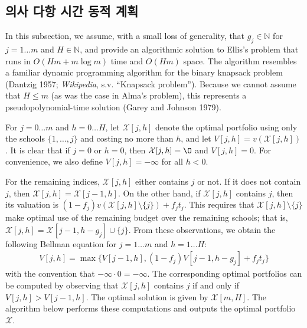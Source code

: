 \documentclass[12pt]{article} %
\newif\ifen
\theoremstyle{definition}
\theoremstyle{definition}
\begin{document}
\ifen \subsection{Pseudopolynomial-time dynamic program} \else\subsection{의사 다항 시간 동적 계획} \fi
In this subsection, we assume, with a small loss of generality, that $g_j \in \mathbb{N}$ for $j = 1\dots m$ and $H \in\mathbb{N}$, and provide an algorithmic solution to Ellis's problem that runs in $O(Hm + m\log m)$ time and $O(Hm)$ space. The algorithm resembles a familiar dynamic programming algorithm for the binary knapsack problem (Dantzig 1957; \emph{Wikipedia}, s.v. ``Knapsack problem''). Because we cannot assume that $H \leq m$ (as was the case in Alma's problem), this represents a pseudopolynomial-time solution (Garey and Johnson 1979).

For $j = 0 \dots m$ and $h = 0 \dots H$, let $\mathcal{X}[j, h]$ denote the optimal portfolio using only the schools $\{ 1, \dots, j\}$ and costing no more than $h$, and let $V[j,h] = v(\mathcal{X}[j, h])$.  It is clear that if $j=0$ or $h=0$, then $\mathcal{X}[j, h] = \O$ and $V[j, h] = 0$.  For convenience, we also define $V[j, h] = -\infty$ for all $h < 0$.

For the remaining indices, $\mathcal{X}[j, h]$ either contains $j$ or not. If it does not contain $j$, then $\mathcal{X}[j, h] = \mathcal{X}[j-1, h]$. On the other hand, if  $\mathcal{X}[j, h]$ contains $j$, then its valuation is $(1 - f_j) v(\mathcal{X}[j, h]\setminus \{j\}) + f_j t_j$. This requires that $\mathcal{X}[j, h]\setminus \{j\}$ make optimal use of the remaining budget over the remaining schools; that is, $\mathcal{X}[j, h] = \mathcal{X}[j-1, h - g_j] \cup\{j\}$. From these observations, we obtain the following Bellman equation for $ j = 1\dots m$ and $h = 1\dots H$:
\begin{align}
V[j, h] = \max\bigl\{ V[j-1, h], (1 - f_j) V[j-1, h-g_j] + f_j t_j \bigr\}
\end{align}
with the convention that $ -\infty \cdot 0 = -\infty$. The corresponding optimal portfolios can be computed by observing that $\mathcal{X}[j, h]$ contains $j$ if and only if $V[j, h]> V[j-1, h]$. The optimal solution is given by $\mathcal{X}[m, H]$. The algorithm below performs these computations and outputs the optimal portfolio $\mathcal{X}$. 
\end{document}
